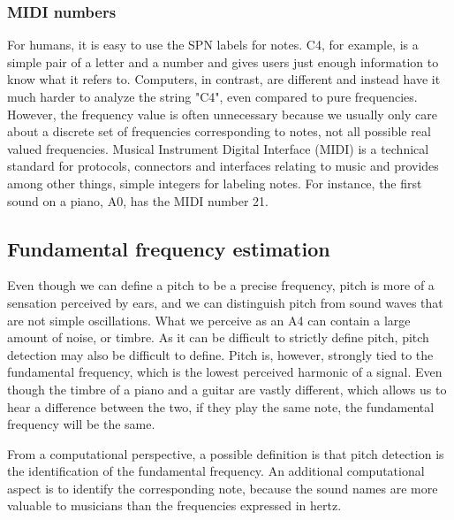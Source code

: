 \subsubsection{MIDI numbers}
For humans, it is easy to use the SPN labels for notes. C4, for example, is a simple pair of a letter and a number and gives users just enough information to know what it refers to. Computers, in contrast, are different and instead have it much harder to analyze the string "C4", even compared to pure frequencies. However, the frequency value is often unnecessary because we usually only care about a discrete set of frequencies corresponding to notes, not all possible real valued frequencies. Musical Instrument Digital Interface (MIDI) is a technical standard for protocols, connectors and interfaces relating to music and provides among other things, simple integers for labeling notes. For instance, the first sound on a piano, A0, has the MIDI number 21. 


% 
\subsection{Fundamental frequency estimation}
Even though we can define a pitch to be a precise frequency, pitch is more of a sensation perceived by ears, and we can distinguish pitch from sound waves that are not simple oscillations. What we perceive as an A4 can contain a large amount of noise, or timbre. As it can be difficult to strictly define pitch, pitch detection may also be difficult to define. Pitch is, however, strongly tied to the fundamental frequency, which is the lowest perceived harmonic of a signal. Even though the timbre of a piano and a guitar are vastly different, which allows us to hear a difference between the two, if they play the same note, the fundamental frequency will be the same. 

From a computational perspective, a possible definition is that pitch detection is the identification of the fundamental frequency. An additional computational aspect is to identify the corresponding note, because the sound names are more valuable to musicians than the frequencies expressed in hertz. 

